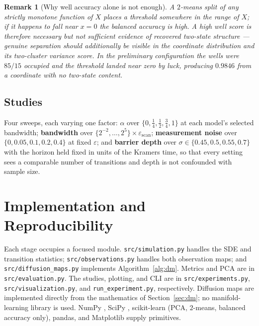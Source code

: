\documentclass[11pt]{article}
\newtheorem{remark}{Remark}
\newcommand{\eps}{\varepsilon}
\begin{document}
\begin{remark}[Why well accuracy alone is not enough]
\label{rem:wellscore}
A $2$-means split of \emph{any} strictly monotone function of $X$ places a
threshold somewhere in the range of $X$; if it happens to fall near $x=0$ the
balanced accuracy is high. A high well score is therefore necessary but not
sufficient evidence of recovered two-state structure --- genuine separation
should additionally be visible in the coordinate distribution and its
two-cluster variance score. In the preliminary
configuration the wells were $85/15$ occupied and the threshold landed near zero
by luck, producing $0.9846$ from a coordinate with no two-state content.
\end{remark}

\subsection{Studies}

Four sweeps, each varying one factor: \textbf{$\alpha$} over
$\{0,\tfrac14,\tfrac12,\tfrac34,1\}$ at each model's selected bandwidth;
\textbf{bandwidth} over $\{2^{-2},\dots,2^5\}\times\eps_{\mathrm{scan}}$;
\textbf{measurement noise} over $\{0,0.05,0.1,0.2,0.4\}$ at fixed $\eps$; and
\textbf{barrier depth} over $\sigma\in\{0.45,0.5,0.55,0.7\}$ with the horizon
held fixed in units of the Kramers time, so that every setting sees a comparable
number of transitions and depth is not confounded with sample size.

\section{Implementation and Reproducibility}
\label{sec:implementation}

Each stage occupies a focused module. \texttt{src/simulation.py} handles the SDE
and transition statistics; \texttt{src/observations.py} handles both observation
maps; and \texttt{src/diffusion\_maps.py} implements Algorithm~\ref{alg:dm}.
Metrics and PCA are in \texttt{src/evaluation.py}. The studies, plotting, and CLI
are in \texttt{src/experiments.py}, \texttt{src/visualization.py}, and
\texttt{run\_experiment.py}, respectively. Diffusion maps are implemented directly from the
mathematics of Section~\ref{sec:dm}; no manifold-learning library is used. NumPy
\citep{harris2020array}, SciPy \citep{virtanen2020scipy}, scikit-learn
\citep{pedregosa2011scikit} (PCA, $2$-means, balanced accuracy only), pandas, and
Matplotlib \citep{hunter2007matplotlib} supply primitives.
\end{document}
